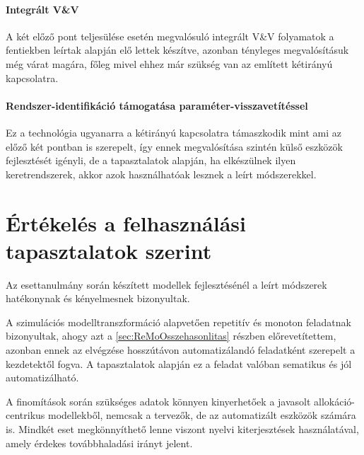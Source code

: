             \paragraph{Integrált V\&V}
            A két előző pont teljesülése esetén megvalósuló integrált V\&V folyamatok a fentiekben leírtak alapján elő lettek készítve, azonban tényleges megvalósításuk még várat magára, főleg mivel ehhez már szükség van az említett kétirányú kapcsolatra.
            
            \paragraph{Rendszer-identifikáció támogatása paraméter-visszavetítéssel}
            Ez a technológia ugyanarra a kétirányú kapcsolatra támaszkodik mint ami az előző két pontban is szerepelt, így ennek megvalósítása szintén külső eszközök fejlesztését igényli, de a tapasztalatok alapján, ha elkészülnek ilyen keretrendszerek, akkor azok használhatóak lesznek a leírt módszerekkel.

    \section{Értékelés a felhasználási tapasztalatok szerint}
    Az esettanulmány során készített modellek fejlesztésénél a leírt módszerek hatékonynak és kényelmesnek bizonyultak.
    
    A szimulációs modelltranszformáció alapvetően repetitív és monoton feladatnak bizonyultak, ahogy azt a \ref{sec:ReMoOsszehasonlitas} részben előrevetítettem, azonban ennek az elvégzése hosszútávon automatizálandó feladatként szerepelt a kezdetektől fogva.
    A tapasztalatok alapján ez a feladat valóban sematikus és jól automatizálható.
    
    A finomítások során szükséges adatok könnyen kinyerhetőek a javasolt allokáció-centrikus modellekből, nemcsak a tervezők, de az automatizált eszközök számára is. Mindkét eset megkönnyíthető lenne viszont nyelvi kiterjesztések használatával, amely érdekes továbbhaladási irányt jelent.